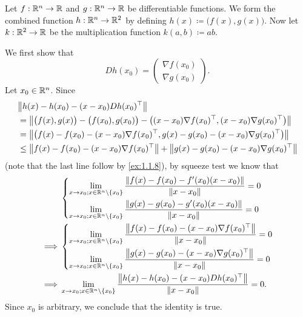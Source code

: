 \begin{eg}\label{6.4.2}
  Let \(f : \R^n \to \R\) and \(g : \R^n \to \R\) be differentiable functions.
  We form the combined function \(h : \R^n \to \R^2\) by defining \(h(x) \coloneqq \big(f(x), g(x)\big)\).
  Now let \(k : \R^2 \to \R\) be the multiplication function \(k(a, b) \coloneqq ab\).

  We first show that
  \[
    D h(x_0) = \begin{pmatrix}
      \nabla f(x_0) \\
      \nabla g(x_0)
    \end{pmatrix}.
  \]
  Let \(x_0 \in \R^n\).
  Since
  \begin{align*}
     & \norm*{h(x) - h(x_0) - (x - x_0) D h(x_0)^\top}                                                                                  \\
     & = \norm*{\big(f(x), g(x)\big) - \big(f(x_0), g(x_0)\big) - \big((x - x_0) \nabla f(x_0)^\top, (x - x_0) \nabla g(x_0)^\top\big)} \\
     & = \norm*{\big(f(x) - f(x_0) - (x - x_0) \nabla f(x_0)^\top, g(x) - g(x_0) - (x - x_0) \nabla g(x_0)^\top\big)}                   \\
     & \leq \norm*{f(x) - f(x_0) - (x - x_0) \nabla f(x_0)^\top} + \norm*{g(x) - g(x_0) - (x - x_0) \nabla g(x_0)^\top}
  \end{align*}
  (note that the last line follow by \cref{ex:1.1.8}),
  by squeeze test we know that
  \begin{align*}
             & \begin{dcases}
                 \lim_{x \to x_0 ; x \in \R^n \setminus \set{x_0}} \dfrac{\norm*{f(x) - f(x_0) - f'(x_0)(x - x_0)}}{\norm*{x - x_0}} = 0 \\
                 \lim_{x \to x_0 ; x \in \R^n \setminus \set{x_0}} \dfrac{\norm*{g(x) - g(x_0) - g'(x_0)(x - x_0)}}{\norm*{x - x_0}} = 0
               \end{dcases}       \\
    \implies & \begin{dcases}
                 \lim_{x \to x_0 ; x \in \R^n \setminus \set{x_0}} \dfrac{\norm*{f(x) - f(x_0) - (x - x_0) \nabla f(x_0)^\top}}{\norm*{x - x_0}} = 0 \\
                 \lim_{x \to x_0 ; x \in \R^n \setminus \set{x_0}} \dfrac{\norm*{g(x) - g(x_0) - (x - x_0) \nabla g(x_0)^\top}}{\norm*{x - x_0}} = 0
               \end{dcases}       \\
    \implies & \lim_{x \to x_0 ; x \in \R^n \setminus \set{x_0}} \dfrac{\norm*{h(x) - h(x_0) - (x - x_0) D h(x_0)^\top}}{\norm*{x - x_0}} = 0.
  \end{align*}
  Since \(x_0\) is arbitrary, we conclude that the identity is true.


\end{eg}
